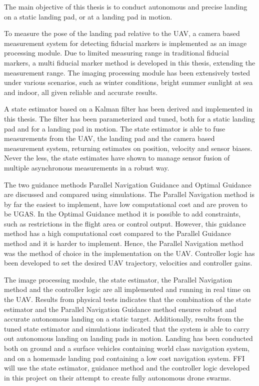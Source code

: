 The main objective of this thesis is to conduct autonomous and precise landing on a static landing pad, or at a landing pad in motion.  

To measure the pose of the landing pad relative to the \gls{UAV}, a camera based measurement system for detecting fiducial markers is implemented as an image processing module. Due to limited measuring range in traditional fiducial markers, a multi fiducial marker method is developed in this thesis, extending the measurement range. The imaging processing module has been extensively tested under various scenarios, such as winter conditions, bright summer sunlight at sea and indoor, all given reliable and accurate results.

A state estimator based on a Kalman filter has been derived and implemented in this thesis. The filter has been parameterized and tuned, both for a static landing pad and for a landing pad in motion. The state estimator is able to fuse measurements from the \gls{UAV}, the landing pad and the camera based measurement system, returning estimates on position, velocity and sensor biases. Never the less, the state estimates have shown to manage sensor fusion of multiple asynchronous measurements in a robust way.

The two guidance methods Parallel Navigation Guidance and Optimal Guidance are discussed and compared using simulations. The Parallel Navigation method is by far the easiest to implement, have low computational cost and are proven to be \gls{UGAS}. In the Optimal Guidance method it is possible to add constraints, such as restrictions in the flight area or control output. However, this guidance method has a high computational cost compared to the Parallel Guidance method and it is harder to implement. Hence, the Parallel Navigation method was the method of choice in the implementation on the \gls{UAV}. Controller logic has been developed to set the desired UAV trajectory, velocities and controller gains.

The image processing module, the state estimator, the Parallel Navigation method and the controller logic are all implemented and running in real time on the \gls{UAV}. Results from physical tests indicates that the combination of the state estimator and the Parallel Navigation Guidance method ensures robust and accurate autonomous landing on a static target. Additionally, results from the tuned state estimator and simulations indicated that the system is able to carry out autonomous landing on landing pads in motion. Landing has been conducted both on ground and a surface vehicles containing world class navigation system, and on a homemade landing pad containing a low cost navigation system. \gls{FFI} will use the state estimator, guidance method and the controller logic developed in this project on their attempt to create fully autonomous drone swarms.


